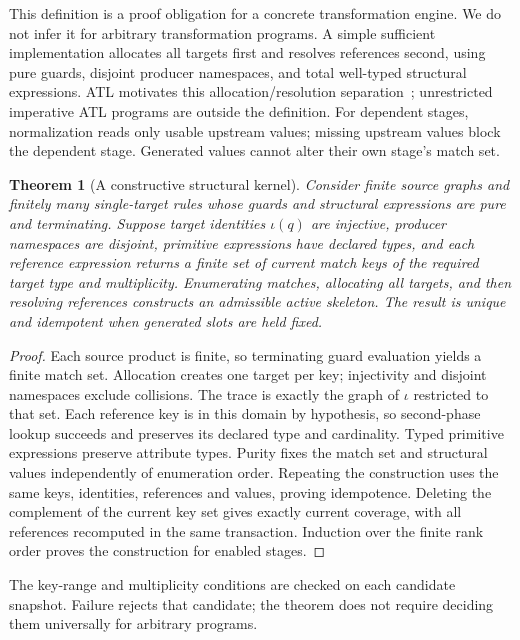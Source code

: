 \documentclass[pdflatex,sn-mathphys-num]{sn-jnl}
\theoremstyle{thmstyleone}
\newtheorem{theorem}{Theorem}
\theoremstyle{thmstylethree}
\theoremstyle{thmstyletwo}
\begin{document}
This definition is a proof obligation for a concrete transformation engine. We do not infer it for arbitrary transformation programs. A simple sufficient implementation allocates all targets first and resolves references second, using pure guards, disjoint producer namespaces, and total well-typed structural expressions. ATL motivates this allocation/resolution separation~\cite{atl}; unrestricted imperative ATL programs are outside the definition. For dependent stages, normalization reads only usable upstream values; missing upstream values block the dependent stage. Generated values cannot alter their own stage's match set.


\begin{theorem}[A constructive structural kernel]\label{thm:kernel}
Consider finite source graphs and finitely many single-target rules whose guards and structural expressions are pure and terminating. Suppose target identities $\iota(q)$ are injective, producer namespaces are disjoint, primitive expressions have declared types, and each reference expression returns a finite set of current match keys of the required target type and multiplicity. Enumerating matches, allocating all targets, and then resolving references constructs an admissible active skeleton. The result is unique and idempotent when generated slots are held fixed.
\end{theorem}
\begin{proof}
Each source product is finite, so terminating guard evaluation yields a finite match set. Allocation creates one target per key; injectivity and disjoint namespaces exclude collisions. The trace is exactly the graph of $\iota$ restricted to that set. Each reference key is in this domain by hypothesis, so second-phase lookup succeeds and preserves its declared type and cardinality. Typed primitive expressions preserve attribute types. Purity fixes the match set and structural values independently of enumeration order. Repeating the construction uses the same keys, identities, references and values, proving idempotence. Deleting the complement of the current key set gives exactly current coverage, with all references recomputed in the same transaction. Induction over the finite rank order proves the construction for enabled stages.\qedhere
\end{proof}

The key-range and multiplicity conditions are checked on each candidate snapshot. Failure rejects that candidate; the theorem does not require deciding them universally for arbitrary programs. 
\end{document}
